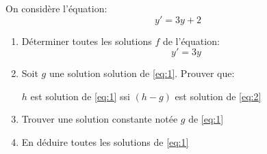 \begin{exercice}
 On consid\`ere l'\'equation:
  \begin{equation}
    \label{eq:1}
    y'=3y+2
  \end{equation}
  \begin{enumerate}
  \item D\'eterminer toutes les solutions $f$ de l'\'equation:
\begin{equation}
    \label{eq:2}
    y'=3y
  \end{equation}

\item Soit $g$ une solution solution de \eqref{eq:1}. Prouver que:\\
\begin{center}
 $h$ est solution de \eqref{eq:1} ssi $(h-g)$ est solution de
 \eqref{eq:2}
\end{center}
\item Trouver une solution constante not\'ee $g$ de \eqref{eq:1}
\item En d\'eduire toutes les solutions de \eqref{eq:1}
  \end{enumerate}
\end{exercice}
